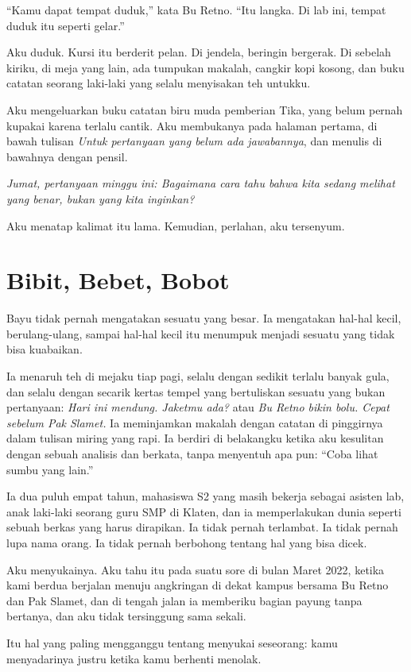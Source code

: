 \documentclass[11pt,twoside,openany]{book}
\begin{document}
``Kamu dapat tempat duduk,'' kata Bu Retno. ``Itu langka. Di lab ini, tempat duduk itu seperti gelar.''

Aku duduk. Kursi itu berderit pelan. Di jendela, beringin bergerak. Di sebelah kiriku, di meja yang lain, ada tumpukan makalah, cangkir kopi kosong, dan buku catatan seorang laki-laki yang selalu menyisakan teh untukku.

Aku mengeluarkan buku catatan biru muda pemberian Tika, yang belum pernah kupakai karena terlalu cantik. Aku membukanya pada halaman pertama, di bawah tulisan \emph{Untuk pertanyaan yang belum ada jawabannya}, dan menulis di bawahnya dengan pensil.

\emph{Jumat, pertanyaan minggu ini: Bagaimana cara tahu bahwa kita sedang melihat yang benar, bukan yang kita inginkan?}

Aku menatap kalimat itu lama. Kemudian, perlahan, aku tersenyum.

\chapter{Bibit, Bebet, Bobot}
Bayu tidak pernah mengatakan sesuatu yang besar. Ia mengatakan hal-hal kecil, berulang-ulang, sampai hal-hal kecil itu menumpuk menjadi sesuatu yang tidak bisa kuabaikan.

Ia menaruh teh di mejaku tiap pagi, selalu dengan sedikit terlalu banyak gula, dan selalu dengan secarik kertas tempel yang bertuliskan sesuatu yang bukan pertanyaan: \emph{Hari ini mendung. Jaketmu ada?} atau \emph{Bu Retno bikin bolu. Cepat sebelum Pak Slamet.} Ia meminjamkan makalah dengan catatan di pinggirnya dalam tulisan miring yang rapi. Ia berdiri di belakangku ketika aku kesulitan dengan sebuah analisis dan berkata, tanpa menyentuh apa pun: ``Coba lihat sumbu yang lain.''

Ia dua puluh empat tahun, mahasiswa S2 yang masih bekerja sebagai asisten lab, anak laki-laki seorang guru SMP di Klaten, dan ia memperlakukan dunia seperti sebuah berkas yang harus dirapikan. Ia tidak pernah terlambat. Ia tidak pernah lupa nama orang. Ia tidak pernah berbohong tentang hal yang bisa dicek.

Aku menyukainya. Aku tahu itu pada suatu sore di bulan Maret 2022, ketika kami berdua berjalan menuju angkringan di dekat kampus bersama Bu Retno dan Pak Slamet, dan di tengah jalan ia memberiku bagian payung tanpa bertanya, dan aku tidak tersinggung sama sekali.

Itu hal yang paling mengganggu tentang menyukai seseorang: kamu menyadarinya justru ketika kamu berhenti menolak.
\end{document}
